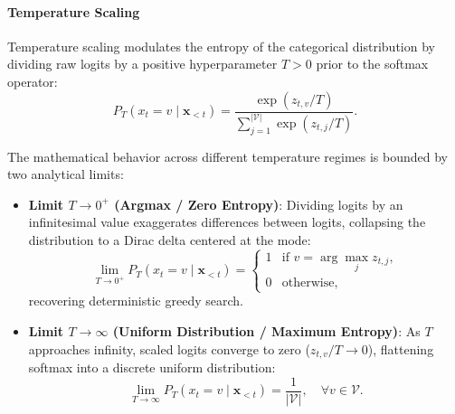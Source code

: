 \documentclass[../../../main.tex]{subfiles}
\begin{document}
\paragraph{Temperature Scaling}
Temperature scaling modulates the entropy of the categorical distribution by dividing raw logits by a positive hyperparameter $T > 0$ prior to the softmax operator:
\begin{equation}
P_T(x_t = v \mid \mathbf{x}_{<t}) = \frac{\exp(z_{t,v} / T)}{\sum_{j=1}^{|\mathcal{V}|} \exp(z_{t,j} / T)}.
\label{eq:temperature_softmax}
\end{equation}

The mathematical behavior across different temperature regimes is bounded by two analytical limits:
\begin{itemize}
    \item \textbf{Limit $T \to 0^+$ (Argmax / Zero Entropy)}: Dividing logits by an infinitesimal value exaggerates differences between logits, collapsing the distribution to a Dirac delta centered at the mode:
    \begin{equation}
    \lim_{T \to 0^+} P_T(x_t = v \mid \mathbf{x}_{<t}) = \begin{cases}
    1 & \text{if } v = \arg\max_{j} z_{t,j}, \\
    0 & \text{otherwise},
    \end{cases}
    \label{eq:temperature_zero_limit}
    \end{equation}
    recovering deterministic greedy search.
    
    \item \textbf{Limit $T \to \infty$ (Uniform Distribution / Maximum Entropy)}: As $T$ approaches infinity, scaled logits converge to zero ($z_{t,v}/T \to 0$), flattening softmax into a discrete uniform distribution:
    \begin{equation}
    \lim_{T \to \infty} P_T(x_t = v \mid \mathbf{x}_{<t}) = \frac{1}{|\mathcal{V}|}, \quad \forall v \in \mathcal{V}.
    \label{eq:temperature_inf_limit}
    \end{equation}
\end{itemize}
\end{document}
